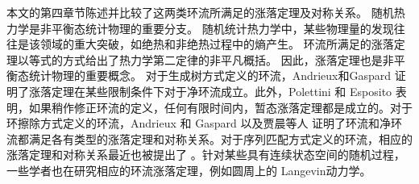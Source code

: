 本文的第四章节陈述并比较了这两类环流所满足的涨落定理及对称关系。
随机热力学是非平衡态统计物理的重要分支。
随机统计热力学中，某些物理量的发现往往是该领域的重大突破，如绝热和非绝热过程中的熵产生。
环流所满足的涨落定理以等式的方式给出了热力学第二定律的非平凡概括\cite{annurev-conmatphys,Seifert_2012,VANDENBROECK20156}。
因此，涨落定理也是非平衡态统计物理的重要概念。
对于生成树方式定义的环流，Andrieux和Gaspard \cite{andrieux2007fluctuation}证明了涨落定理在某些限制条件下对于净环流成立。此外，Polettini 和 Esposito \cite{polettini2014transient}表明，如果稍作修正环流的定义，任何有限时间内，暂态涨落定理都是成立的。对于环擦除方式定义的环流，Andrieux 和 Gaspard \cite{andrieux2007network}以及贾晨等人 \cite{jia2016cycle} 证明了环流和净环流都满足各有类型的涨落定理和对称关系。对于序列匹配方式定义的环流，相应的涨落定理和对称关系最近也被提出了 \cite{pietzonka2021cycle}。针对某些具有连续状态空间的随机过程，一些学者也在研究相应的环流涨落定理，例如圆周上的 Langevin动力学\cite{ge2017cycle}。

